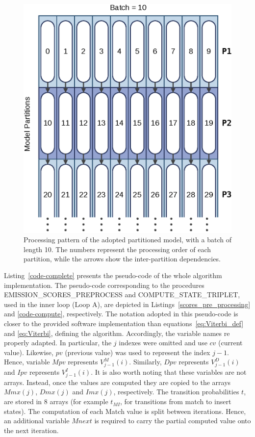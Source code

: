 \documentclass{bmcart}
\begin{document}
\begin{figure}[h!]
  \centering
  \includegraphics[scale=0.5]{img/partitions.eps} 
  \caption{Processing pattern of the adopted partitioned model, with a batch of length 10. The numbers represent the processing order of each partition, while the arrows show the inter-partition dependencies.}
  \label{figure-partitions}
\end{figure}

Listing~\ref{code-complete} presents the pseudo-code of the whole algorithm implementation. The pseudo-code corresponding to the procedures EMISSION\_SCORES\_PREPROCESS and COMPUTE\_STATE\_TRIPLET, used in the inner loop (Loop A), are depicted in Listings~\ref{scores_pre_processing} and \ref{code-compute}, respectively. The notation adopted in this pseudo-code is closer to the provided software implementation than equations~\ref{eq:Viterbi_def} and \ref{eq:Viterbi}, defining the algorithm. Accordingly, the variable names re properly adapted. In particular, the $j$ indexes were omitted and use $cv$ (current value). Likewise, $pv$ (previous value) was used to represent the index $j-1$. Hence, variable $Mpv$ represents  $V^M_{j-1} (i)$. Similarly, $Dpv$ represents $V^D_{j-1} (i)$ and $Ipv$ represents $V^I_{j-1} (i)$. 
It is also worth noting that these variables are not arrays. Instead, once the values are computed they are copied to the arrays $Mmx(j)$, $Dmx(j)$ and $Imx(j)$, respectively. The transition probabilities $t$, are stored in $8$ arrays (for example $t_{MI}$, for transitions from match to insert states). The computation of each Match value is split between iterations. Hence, an additional variable $Mnext$ is required to carry the partial computed value onto the next iteration.
\end{document}
